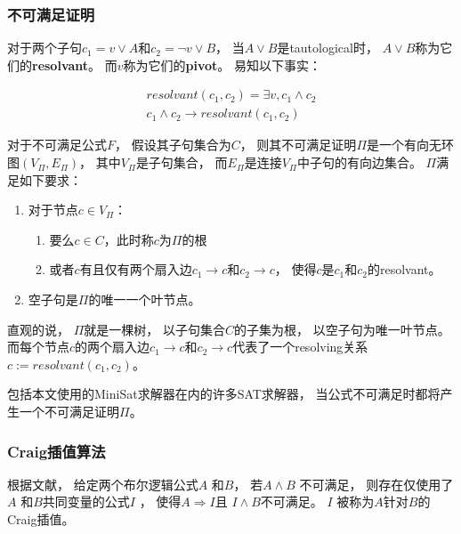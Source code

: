 \subsubsection{不可满足证明}
对于两个子句$c_1=v\vee A$和$c_2=\neg v\vee B$，
当$A\vee B$是tautological时，
$A\vee B$称为它们的\textbf{resolvant}。
而$v$称为它们的\textbf{pivot}。
易知以下事实：

\begin{equation}
\begin{array}{ccc}
&resolvant(c_1,c_2) = \exists v, c_1\wedge c_2 &\\
&c_1\wedge c_2 \to resolvant(c_1,c_2)&
\end{array}
\end{equation}

\begin{definition}
对于不可满足公式$F$，
假设其子句集合为$C$，
则其不可满足证明$\Pi$是一个有向无环图$(V_{\Pi},E_{\Pi})$，
其中$V_{\Pi}$是子句集合，
而$E_{\Pi}$是连接$V_{\Pi}$中子句的有向边集合。
$\Pi$满足如下要求：
\begin{enumerate}
\item 对于节点$c\in V_{\Pi}$：
  \begin{enumerate}
    \item 要么$c\in C$，此时称$c$为$\Pi$的根
    \item 或者$c$有且仅有两个扇入边$c_1\to c$和$c_2\to c$，
    使得$c$是$c_1$和$c_2$的resolvant。
  \end{enumerate}
\item 空子句是$\Pi$的唯一一个叶节点。
\end{enumerate}
\end{definition}

直观的说，
$\Pi$就是一棵树，
以子句集合$C$的子集为根，
以空子句为唯一叶节点。
而每个节点$c$的两个扇入边$c_1\to c$和$c_2\to c$代表了一个resolving关系$c:=resolvant(c_1,c_2)$。

包括本文使用的MiniSat求解器在内的许多SAT求解器，
当公式不可满足时都将产生一个不可满足证明$\Pi$。

\subsubsection{Craig插值算法}

根据文献，
给定两个布尔逻辑公式$A$ 和$B$，
若$A\wedge B$ 不可满足，
则存在仅使用了$A$ 和$B$共同变量的公式$I$ ，
使得$A\Rightarrow I$且
$I\wedge B$不可满足。
$I$ 被称为$A$针对$B$的Craig插值。


